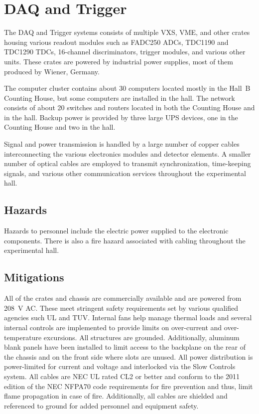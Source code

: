 \section{DAQ and Trigger}

The DAQ and Trigger systems consists of multiple VXS, VME, and other crates housing 
various readout modules such as FADC250 ADCs, TDC1190 and TDC1290 TDCs, 16-channel 
discriminators, trigger modules, and various other units. These crates are powered 
by industrial power supplies, most of them produced by Wiener, Germany.

The computer cluster contains about 30 computers located mostly in the Hall~B Counting 
House, but some computers are installed in the hall. The network consists of about 20 
switches and routers located in both the Counting House and in the hall. Backup power 
is provided by three large UPS devices, one in the Counting House and two in the hall.

Signal and power transmission is handled by a large number of copper cables interconnecting  
the various electronics modules and detector elements. A smaller number of optical cables 
are employed to transmit synchronization, time-keeping signals, and various other 
communication services throughout the experimental hall.

\subsection{Hazards} 

Hazards to personnel include the electric power supplied to the electronic components. There 
is also a fire hazard associated with cabling throughout the experimental hall.

\subsection{Mitigations}

All of the crates and chassis are commercially available and are powered from 208~V AC. 
These meet stringent safety requirements set by various qualified agencies such UL and TUV. 
Internal fans help manage thermal loads and several internal controls are implemented to 
provide limits on over-current and over-temperature excursions. All structures are grounded. 
Additionally, aluminum blank panels have been installed to limit access to the backplane on 
the rear of the chassis and on the front side where slots are unused. All power distribution 
is power-limited for current and voltage and interlocked via the Slow Controls system. All 
cables are NEC UL rated CL2 or better and conform to the 2011 edition of the NEC NFPA70 code 
requirements for fire prevention and thus, limit flame propagation in case of fire. Additionally, 
all cables are shielded and referenced to ground for added personnel and equipment safety.

